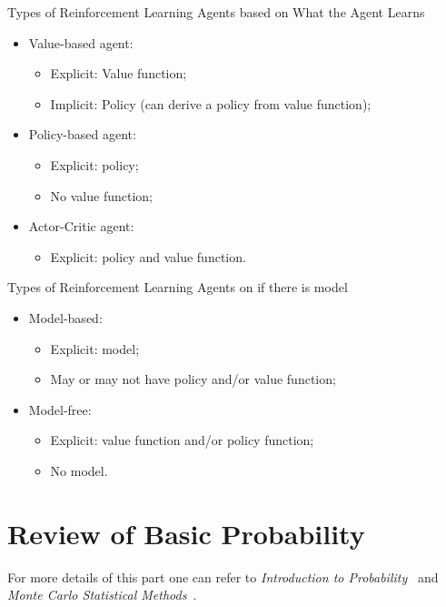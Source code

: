 \documentclass{progartcn}
\begin{document}
	Types of Reinforcement Learning Agents based on What the Agent Learns
	\begin{itemize}[noitemsep,topsep=0pt]
		\item Value-based agent:
		\begin{itemize}[noitemsep,topsep=0pt]
			\item Explicit: Value function;
			\item Implicit: Policy (can derive a policy from value function);
		\end{itemize}
		\item Policy-based agent: 
		\begin{itemize}[noitemsep,topsep=0pt]
			\item Explicit: policy;
			\item No value function;
		\end{itemize}
		\item Actor-Critic agent:
		\begin{itemize}[noitemsep,topsep=0pt]
			\item Explicit: policy and value function.\\
		\end{itemize}
	\end{itemize}

	Types of Reinforcement Learning Agents on if there is model
	\begin{itemize}[noitemsep,topsep=0pt]
		\item Model-based:
		\begin{itemize}[noitemsep,topsep=0pt]
			\item Explicit: model;
			\item May or may not have policy and/or value function;
		\end{itemize}
		\item Model-free: 
		\begin{itemize}[noitemsep,topsep=0pt]
			\item Explicit: value function and/or policy function;
			\item No model.
		\end{itemize}
	\end{itemize}

\pagebreak

\section{Review of Basic Probability}

	For more details of this part one can refer to \textit{Introduction to Probability}~\cite{HB} and \textit{Monte Carlo Statistical Methods}~\cite{robert2013monte}.\\
\end{document}
